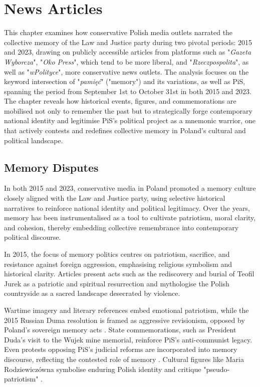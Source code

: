 \section{News Articles}

This chapter examines how conservative Polish media outlets narrated the collective memory of the Law and Justice party during two pivotal periods: 2015 and 2023, drawing on publicly accessible articles from platforms such as "\textit{Gazeta Wyborcza}", "\textit{Oko Press}", which tend to be more liberal, and "\textit{Rzeczpospolita}", as well as "\textit{wPolityce}", more conservative news outlets. The analysis focuses on the keyword intersection of "\textit{pamięć}" ("memory") and its variations, as well as PiS, spanning the period from September 1st to October 31st in both 2015 and 2023.  The chapter reveals how historical events, figures, and commemorations are mobilised not only to remember the past but to strategically forge contemporary national identity and legitimise PiS's political project as a mnemonic warrior, one that actively contests and redefines collective memory in Poland's cultural and political landscape.


\subsection{Memory Disputes}

In both 2015 and 2023, conservative media in Poland promoted a memory culture closely aligned with the Law and Justice party, using selective historical narratives to reinforce national identity and political legitimacy. Over the years, memory has been instrumentalised as a tool to cultivate patriotism, moral clarity, and cohesion, thereby embedding collective remembrance into contemporary political discourse.

In 2015, the focus of memory politics centres on patriotism, sacrifice, and resistance against foreign aggression, emphasising religious symbolism and historical clarity. Articles present acts such as the rediscovery and burial of Teofil Jurek as a patriotic and spiritual resurrection \citep{wpolityce_ostatni_2015} and mythologise the Polish countryside as a sacred landscape desecrated by violence.

Wartime imagery and literary references embed emotional patriotism, while the 2015 Russian Duma resolution is framed as aggressive revisionism, opposed by Poland's sovereign memory acts \break\citep{wpolityce_moskiewska_2015}. State commemorations, such as President Duda's visit to the Wujek mine memorial, reinforce PiS's anti-communist legacy. Even protests opposing PiS's judicial reforms are incorporated into memory discourse, reflecting the contested role of memory \citep{wpolityce_prezydent_2015}. Cultural figures like Maria Rodziewiczówna symbolise enduring Polish identity and critique "pseudo-patriotism" \citep{wpolityce_skoro_2015}.

